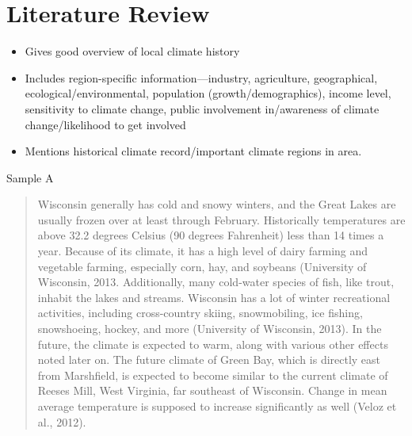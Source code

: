 \documentclass{article}\usepackage[]{graphicx}\usepackage[]{color}
\begin{document}
\section{Literature Review}
\begin{itemize}
  \item Gives good overview of local climate history
  \item Includes region-specific information—industry, agriculture, geographical, ecological/environmental, population (growth/demographics), income level, sensitivity to climate change, public involvement in/awareness of climate change/likelihood to get involved
  \item Mentions historical climate record/important climate regions in area.
\end{itemize}
Sample A
\begin{quote}
Wisconsin generally has cold and snowy winters, and the Great Lakes are usually frozen over at least through February. Historically temperatures are above 32.2 degrees Celsius (90 degrees Fahrenheit) less than 14 times a year. Because of its climate, it has a high level of dairy farming and vegetable farming, especially corn, hay, and soybeans (University of Wisconsin, 2013. Additionally, many cold-water species of fish, like trout, inhabit the lakes and streams. Wisconsin has a lot of winter recreational activities, including cross-country skiing, snowmobiling, ice fishing, snowshoeing, hockey, and more (University of Wisconsin, 2013). In the future, the climate is expected to warm, along with various other effects noted later on. The future climate of Green Bay, which is directly east from Marshfield, is expected to become similar to the current climate of Reeses Mill, West Virginia, far southeast of Wisconsin. Change in mean average temperature is supposed to increase significantly as well (Veloz et al., 2012). 
\end{quote}
\end{document}
